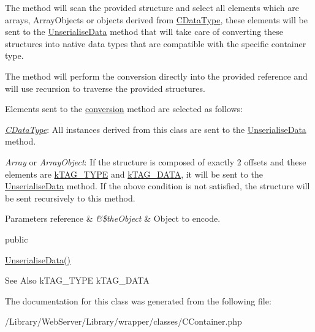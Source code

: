 The method will scan the provided structure and select all elements which are arrays, Array\-Objects or objects derived from \hyperlink{class_c_data_type}{C\-Data\-Type}, these elements will be sent to the \hyperlink{class_c_container_a09d585e2a9809221a42d52d7520c9cbf}{Unserialise\-Data} method that will take care of converting these structures into native data types that are compatible with the specific container type.

The method will perform the conversion directly into the provided reference and will use recursion to traverse the provided structures.

Elements sent to the \hyperlink{class_c_container_a09d585e2a9809221a42d52d7520c9cbf}{conversion} method are selected as follows\-:


\begin{DoxyItemize}
\item {\itshape \hyperlink{class_c_data_type}{C\-Data\-Type}}\-: All instances derived from this class are sent to the \hyperlink{class_c_container_a09d585e2a9809221a42d52d7520c9cbf}{Unserialise\-Data} method. 
\item {\itshape Array} or {\itshape Array\-Object}\-: If the structure is composed of exactly 2 offsets and these elements are \hyperlink{}{k\-T\-A\-G\-\_\-\-T\-Y\-P\-E} and \hyperlink{}{k\-T\-A\-G\-\_\-\-D\-A\-T\-A}, it will be sent to the \hyperlink{class_c_container_a09d585e2a9809221a42d52d7520c9cbf}{Unserialise\-Data} method. If the above condition is not satisfied, the structure will be sent recursively to this method. 
\end{DoxyItemize}


\begin{DoxyParams}[1]{Parameters}
reference & {\em \&\$the\-Object} & Object to encode.\\
\hline
\end{DoxyParams}
public

\hyperlink{class_c_container_a09d585e2a9809221a42d52d7520c9cbf}{Unserialise\-Data()}

\begin{DoxySeeAlso}{See Also}
k\-T\-A\-G\-\_\-\-T\-Y\-P\-E k\-T\-A\-G\-\_\-\-D\-A\-T\-A 
\end{DoxySeeAlso}


The documentation for this class was generated from the following file\-:\begin{DoxyCompactItemize}
\item 
/\-Library/\-Web\-Server/\-Library/wrapper/classes/C\-Container.\-php\end{DoxyCompactItemize}
